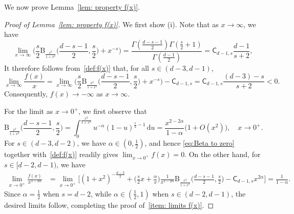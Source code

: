 \documentclass{amsart}
\newcommand{\ud}{\, \mathrm{d}}
\theoremstyle{plain}
\theoremstyle{remark}
\numberwithin{equation}{section}
\begin{document}
We now prove Lemma~\ref{lem: property f(x)}. 
 

\begin{proof}[Proof of Lemma~\ref{lem: property f(x)}]
We first show \textrm{(i)}. Note that as $x\to\infty$, we have 
\begin{equation}\label{eq:Beta completion}
    \lim_{x\to \infty}\Big(\frac{s}{2}\mathrm{B}_{\frac{x^2}{1+x^2}}\Big(\frac{d-s-1}{2},\frac{s}{2}\Big)+x^{-s}\Big) 
    = \frac{\Gamma(\frac{d-s-1}{2})\Gamma(\frac{s}{2}+1)} {\Gamma(\frac{d-1}{2})}
    = \mathsf{C}_{d-1,s}\frac{d-1}{s+2},
\end{equation}
It therefore follows from~\eqref{def:f(x)} that, for all $s\in(d-3,d-1)$,
\begin{equation}
    \lim_{x\to\infty} \frac{f(x)}{x} =\lim_{x\to \infty}
    \Big(\frac{s}{2}\mathrm{B}_{\frac{x^2}{1+x^2}}\Big(\frac{d-s-1}{2},\frac{s}{2}\Big)+x^{-s}\Big) - \mathsf{C}_{d-1,s} = \mathsf{C}_{d-1,s} \frac{(d-3)-s}{s+2} <0.
\end{equation}
Consequently, $f(x)\to-\infty$ as $x\to\infty$. 

For the limit as $x\to0^+$, we first observe that 
\begin{equation}\label{eq:Beta to zero}
    \mathrm{B}_{\frac{x^2}{1+x^2}}\Big(\frac{d-s-1}{2},\frac{s}{2}\Big) =\int_0^{\frac{x^2}{1+x^2}} u^{-\alpha} (1-u)^{\frac{s}{2}-1}\ud u = \frac{x^{2-2\alpha}}{1-\alpha}\big(1+ O(x^2)\big), \quad x\to 0^+.
\end{equation}
For $s\in(d-3,d-2)$, we have $\alpha\in(0,\frac12)$, and hence \eqref{eq:Beta to zero} together with~\eqref{def:f(x)} readily gives $\lim_{x\to 0^+}f(x)=0$. On the other hand, for $s\in[d-2,d-1)$, we have
\begin{align*}
    \lim_{x\to0^+}\frac{f(x)}{x^{1-2\alpha}}
    &=
    \lim_{x\to0^+}
    \bigg[
        (1+x^2)^{-\frac{d-3}{2}}
        +
        \Big(\frac{s}{2}x+\frac{\alpha}{x}\Big)
        \frac{1}{x^{1-2\alpha}}
        \mathrm{B}_{\frac{x^2}{1+x^2}}
        \Big(
            \frac{d-s-1}{2},\frac{s}{2}
        \Big)
        -
        \mathsf{C}_{d-1,s}x^{2\alpha}
    \bigg]
    =
    \frac{1}{1-\alpha}.
\end{align*} 
Since $\alpha=\frac{1}{2}$ when $s=d-2$, while $\alpha\in(\frac{1}{2},1)$ when $s\in(d-2,d-1)$, the desired limits follow, completing the proof of~\ref{item: limits f(x)}.  


\end{proof}
\end{document}

